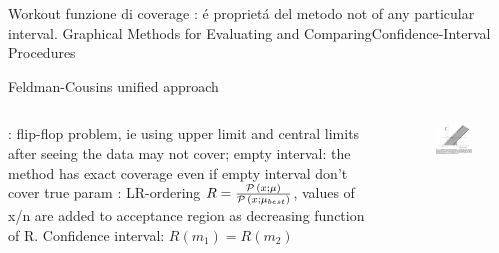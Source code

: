 \documentclass[asd-beamer.tex]{subfiles}
\begin{document}
\begin{wordonframe}{Workout funzione di coverage}
: \'e propriet\'a del metodo not of any particular interval.
Graphical Methods for Evaluating and ComparingConfidence-Interval Procedures
\end{wordonframe}

\begin{frame}{Feldman-Cousins unified approach}\frameintoc
\begin{columns}[T]
\begin{column}{0.5\textwidth}
: flip-flop problem, ie using upper limit and central limits after seeing the data may not cover; empty interval: the method has exact coverage even if empty interval don't cover true param
: LR-ordering $R=\frac{\operatorname{\mathcal{P}}{(x;\mu)}}{\operatorname{\mathcal{P}}{(x;\mu_{best})}}$, values of x/n are added to acceptance region as decreasing function of R.
Confidence interval: $R(m_1)=R(m_2)$
\end{column}
\begin{column}{0.5\textwidth}
\begin{figure}[!ht]\includegraphics[trim={0cm 0cm 0 0},clip, keepaspectratio,height=0.49\textheight]{figures/james/estimators/flipflopping}\label{fig:flipflopping}\end{figure}
\end{column}
\end{columns}

\end{frame}
\end{document}
